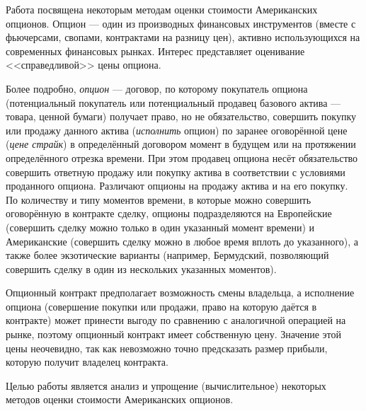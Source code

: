 \intro
Работа посвящена некоторым методам оценки стоимости Американских опционов. Опцион --- один из производных финансовых инструментов (вместе с фьючерсами, свопами, контрактами на разницу цен), активно использующихся на современных финансовых рынках. Интерес представляет оценивание <<справедливой>> цены опциона.

Более подробно, \emph{опцион} --- договор, по которому покупатель опциона (потенциальный покупатель или потенциальный продавец базового актива — товара, ценной бумаги) получает право, но не обязательство, совершить покупку или продажу данного актива (\emph{исполнить} опцион) по заранее оговорённой цене (\emph{цене страйк}) в определённый договором момент в будущем или на протяжении определённого отрезка времени. При этом продавец опциона несёт обязательство совершить ответную продажу или покупку актива в соответствии с условиями проданного опциона. Различают опционы на продажу актива и на его покупку. По количеству и типу моментов времени, в которые можно совершить оговорённую в контракте сделку, опционы подразделяются на Европейские (совершить сделку можно только в один указанный момент времени) и Американские (совершить сделку можно в любое время вплоть до указанного), а также более экзотические варианты (например, Бермудский, позволяющий совершить сделку в один из нескольких указанных моментов).

Опционный контракт предполагает возможность смены владельца, а исполнение опциона (совершение покупки или продажи, право на которую даётся в контракте) может принести выгоду по сравнению с аналогичной операцией на рынке, поэтому опционный контракт имеет собственную цену. Значение этой цены неочевидно, так как невозможно точно предсказать размер прибыли, которую получит владелец контракта.

Целью работы является анализ и упрощение (вычислительное) некоторых методов оценки стоимости Американских опционов.
